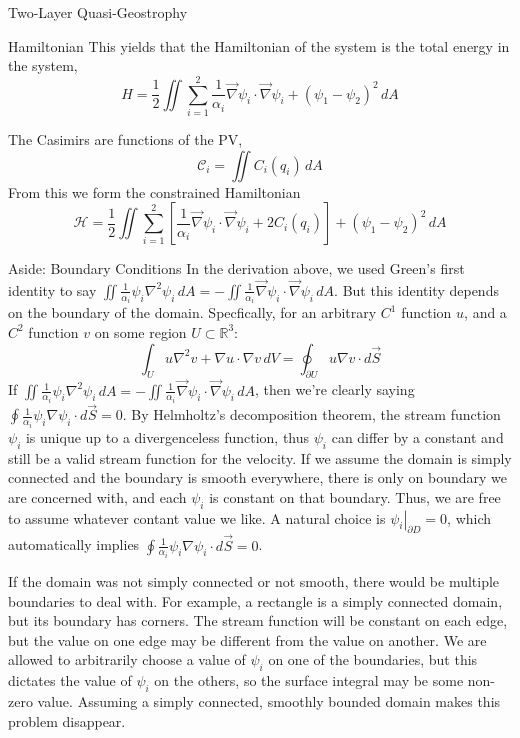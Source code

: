 \documentclass[12pt]{article}
\begin{document}
\begin{section}{Two-Layer Quasi-Geostrophy}
\begin{subsection}{Hamiltonian}
        This yields that the Hamiltonian of the system is the total energy in the system,
        $$
        H = \frac12 \iint \sum_{i=1}^2 \frac{1}{\alpha_i}\vec\nabla \psi_i \cdot \vec\nabla \psi_i + (\psi_1 - \psi_2)^2 \, dA
        $$

        The Casimirs are functions of the PV,
        $$
        \mathcal{C}_i = \iint C_i(q_i) \, dA
        $$
        From this we form the constrained Hamiltonian
        \begin{equation}
            \mathcal{H} = \frac12 \iint \sum_{i=1}^2 \left[ \frac{1}{\alpha_i} \vec\nabla \psi_i \cdot \vec\nabla \psi_i + 2C_i(q_i) \right]+ (\psi_1 - \psi_2)^2 \, dA
            \label{eqn:qg_tl_h}
        \end{equation}

        \begin{subsubsection}{Aside: Boundary Conditions}
            In the derivation above, we used Green's first identity to say $\iint \frac{1}{\alpha_i}\psi_i \nabla^2 \psi_i \, dA = - \iint \frac{1}{\alpha_i} \vec\nabla\psi_i \cdot \vec\nabla\psi_i \, dA$. But this identity depends on the boundary of the domain. Specfically, for an arbitrary $C^1$ function $u$, and a $C^2$ function $v$ on some region $U \subset \mathbb{R}^3$:
            $$
            \int_U u \nabla^2 v + \nabla u \cdot \nabla v \, dV = \oint_{\partial U} u \nabla v \cdot d \vec S
            $$
            If $\iint \frac{1}{\alpha_i}\psi_i \nabla^2 \psi_i \, dA = - \iint \frac{1}{\alpha_i} \vec\nabla\psi_i \cdot \vec\nabla\psi_i \, dA$, then we're clearly saying $\oint \frac{1}{\alpha_i}\psi_i \nabla \psi_i\cdot d \vec S = 0$. By Helmholtz's decomposition theorem, the stream function $\psi_i$ is unique up to a divergenceless function, thus $\psi_i$ can differ by a constant and still be a valid stream function for the velocity. If we assume the domain is simply connected and the boundary is smooth everywhere, there is only on boundary we are concerned with, and each $\psi_i$ is constant on that boundary. Thus, we are free to assume whatever contant value we like. A natural choice is $\left. \psi_i \right|_{\partial D} = 0$, which automatically implies $\oint \frac{1}{\alpha_i}\psi_i \nabla \psi_i \cdot d \vec S = 0$.

            If the domain was not simply connected or not smooth, there would be multiple boundaries to deal with. For example, a rectangle is a simply connected domain, but its boundary has corners. The stream function will be constant on each edge, but the value on one edge may be different from the value on another. We are allowed to arbitrarily choose a value of $\psi_i$ on one of the boundaries, but this dictates the value of $\psi_i$ on the others, so the surface integral may be some non-zero value. Assuming a simply connected, smoothly bounded domain makes this problem disappear.
        \end{subsubsection}
    \end{subsection}


\end{section}
\end{document}
